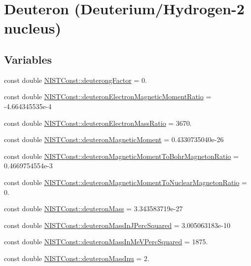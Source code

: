\hypertarget{group___deuteron}{}\section{Deuteron (Deuterium/\+Hydrogen-\/2 nucleus)}
\label{group___deuteron}
\subsection*{Variables}
\begin{DoxyCompactItemize}
\item 
const double \hyperlink{group___deuteron_ga975b6e46b7ceaa0780c4b066a52444b7}{N\+I\+S\+T\+Const\+::deuterong\+Factor} = 0.
\item 
const double \hyperlink{group___deuteron_gaa01fffefa3ab64430fabf08808572689}{N\+I\+S\+T\+Const\+::deuteron\+Electron\+Magnetic\+Moment\+Ratio} = -\/4.\+664345535e-\/4
\item 
const double \hyperlink{group___deuteron_gaf25b1cce3ab8e1ec7f4f7790ea06ad0b}{N\+I\+S\+T\+Const\+::deuteron\+Electron\+Mass\+Ratio} = 3670.
\item 
const double \hyperlink{group___deuteron_gac8f7404645a2f994d9b1eda283e441d5}{N\+I\+S\+T\+Const\+::deuteron\+Magnetic\+Moment} = 0.\+4330735040e-\/26
\item 
const double \hyperlink{group___deuteron_ga6eb7ee28bf12ef4d2e7acf59d29f6450}{N\+I\+S\+T\+Const\+::deuteron\+Magnetic\+Moment\+To\+Bohr\+Magneton\+Ratio} = 0.\+4669754554e-\/3
\item 
const double \hyperlink{group___deuteron_ga686e76e6696a7312486f6e39e4583d0b}{N\+I\+S\+T\+Const\+::deuteron\+Magnetic\+Moment\+To\+Nuclear\+Magneton\+Ratio} = 0.
\item 
const double \hyperlink{group___deuteron_ga6795eea7d04fa12d83ce437e2e07e2a8}{N\+I\+S\+T\+Const\+::deuteron\+Mass} = 3.\+343583719e-\/27
\item 
const double \hyperlink{group___deuteron_ga6b5a049d972613d8d885f53880399100}{N\+I\+S\+T\+Const\+::deuteron\+Mass\+In\+J\+Perc\+Squared} = 3.\+005063183e-\/10
\item 
const double \hyperlink{group___deuteron_ga995aff603756394740d5eacd29265d20}{N\+I\+S\+T\+Const\+::deuteron\+Mass\+In\+Me\+V\+Perc\+Squared} = 1875.
\item 
const double \hyperlink{group___deuteron_ga65b03219bebd7561b1dae8f084c3d090}{N\+I\+S\+T\+Const\+::deuteron\+Mass\+Inu} = 2.

\end{DoxyCompactItemize}
